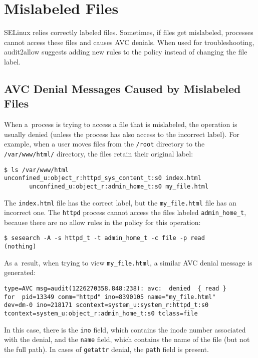 \section{Mislabeled Files}
\label{mislabeled}
SELinux relies correctly labeled files. Sometimes, if files get mislabeled,
processes cannot access these files and causes AVC denials. When used for
troubleshooting, audit2allow suggests adding new rules to the policy instead of
changing the file label.

\subsection{AVC Denial Messages Caused by Mislabeled Files}
When a~process is trying to access a file that is mislabeled, the operation is
usually denied (unless the process has also access to the incorrect label). For
example, when a user moves files from the \texttt{/root} directory to the
\texttt{/var/www/html/} directory, the files retain their original label:
\begin{lstlisting}
$ ls /var/www/html
unconfined_u:object_r:httpd_sys_content_t:s0 index.html
       unconfined_u:object_r:admin_home_t:s0 my_file.html
\end{lstlisting}
The \texttt{index.html} file has the correct label, but the
\texttt{my\_file.html} file has an incorrect one. The \texttt{httpd} process
cannot access the files labeled \texttt{admin\_home\_t}, because there are no
allow rules in the policy for this operation:
\begin{lstlisting}
$ sesearch -A -s httpd_t -t admin_home_t -c file -p read
(nothing)
\end{lstlisting}

As a~result, when trying to view \texttt{my\_file.html}, a similar AVC denial
message is generated:
\begin{lstlisting}
type=AVC msg=audit(1226270358.848:238): avc:  denied  { read }
for  pid=13349 comm="httpd" ino=8390105 name="my_file.html"
dev=dm-0 ino=218171 scontext=system_u:system_r:httpd_t:s0
tcontext=system_u:object_r:admin_home_t:s0 tclass=file
\end{lstlisting}
In this case, there is the \texttt{ino} field, which contains the inode number
associated with the denial, and the \texttt{name} field, which contains the name
of the file (but not the full path). In cases of \texttt{getattr} denial, the
\texttt{path} field is present.


